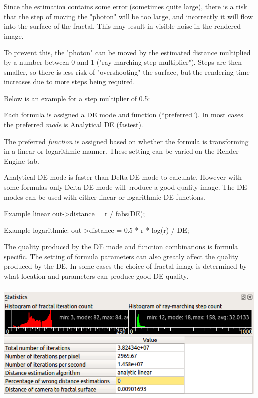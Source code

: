Since the estimation contains some error (sometimes quite large), there
is a risk that the step of moving the "photon" will be too large, and
incorrectly it will flow into the surface of the fractal. This may
result in visible noise in the rendered image.

To prevent this, the "photon" can be moved by the estimated distance
multiplied by a number between 0 and 1 ("ray-marching step multiplier").
Steps are then smaller, so there is less risk of "overshooting" the
surface, but the rendering time increases due to more steps being
required.

Below is an example for a step multiplier of 0.5:

Each formula is assigned a DE mode and function (``preferred''). In most
cases the preferred \emph{mode} is Analytical DE (fastest).

The preferred \emph{function} is assigned based on whether the formula
is transforming in a linear or logarithmic manner. These setting can be
varied on the Render Engine tab.

Analytical DE mode is faster than Delta DE mode to calculate. However
with some formulas only Delta DE mode will produce a good quality image.
The DE modes can be used with either linear or logarithmic DE functions.

Example linear out-\textgreater{}distance = r / fabs(DE);

Example logarithmic: out-\textgreater{}distance = 0.5 * r * log(r) / DE;

The quality produced by the DE mode and function combinations is formula
specific. The setting of formula parameters can also greatly affect the
quality produced by the DE. In some cases the choice of fractal image is
determined by what location and parameters can produce good DE quality.

\includegraphics[width=5.71890in,height=2.32283in]{img/manual/media/image6.png}

